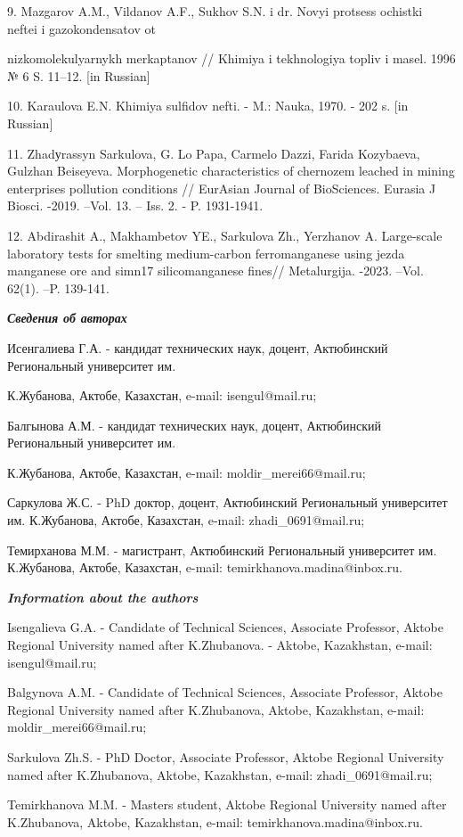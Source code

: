 \begin{noparindent}
9.
  Mazgarov A.M., Vil\textquotesingle danov A.F., Sukhov S.N. i dr. Novyi
  protsess ochistki neftei i gazokondensatov ot

  nizkomolekulyarnykh
  merkaptanov // Khimiya i tekhnologiya topliv i masel. 1996 № 6 S.
  11--12. {[}in Russian{]}

10.
  Karaulova E.N. Khimiya sul\textquotesingle fidov nefti. - M.: Nauka,
  1970. - 202 s. {[}in Russian{]}

11.
  Zhadуrassyn Sarkulova, G. Lo Papa, Carmelo Dazzi, Farida Kozybaeva,
  Gulzhan Beiseyeva. Morphogenetic characteristics of chernozem leached
  in mining enterprises pollution conditions // EurAsian Journal of
  BioSciences. Eurasia J Biosci. -2019. --Vol. 13. -- Iss. 2. - P.
  1931-1941.

12.
  Abdirashit A., Makhambetov YE., Sarkulova Zh., Yerzhanov A.
  Large-scale laboratory tests for smelting medium-carbon ferromanganese
  using jezda manganese ore and simn17 silicomanganese fines//
  Metalurgija. -2023. --Vol. 62(1). --P. 139-141.
\end{noparindent}

\emph{{\bfseries Сведения об авторах}}

\begin{noparindent}
Исенгалиева Г.А. - кандидат технических наук, доцент, Актюбинский
Региональный университет им.

К.Жубанова, Актобе, Казахстан, e-mail:
isengul@mail.ru;

Балгынова А.М. - кандидат технических наук, доцент, Актюбинский
Региональный университет им.

К.Жубанова, Актобе, Казахстан, e-mail:
moldir\_merei66@mail.ru;

Саркулова Ж.С. - PhD доктор, доцент, Актюбинский Региональный
университет им. К.Жубанова, Актобе, Казахстан, e-mail:
zhadi\_0691@mail.ru;

Темирханова М.М. - магистрант, Актюбинский Региональный университет им.
К.Жубанова, Актобе, Казахстан, e-mail: temirkhanova.madina@inbox.ru.
\end{noparindent}

\emph{{\bfseries Information about the authors}}

\begin{noparindent}
Isengalieva G.A. - Candidate of Technical Sciences, Associate Professor,
Aktobe Regional University named after K.Zhubanova. - Aktobe,
Kazakhstan, e-mail: isengul@mail.ru;

Balgynova A.M. - Candidate of Technical Sciences, Associate Professor,
Aktobe Regional University named after K.Zhubanova, Aktobe, Kazakhstan,
e-mail: moldir\_merei66@mail.ru;

Sarkulova Zh.S. - PhD Doctor, Associate Professor, Aktobe Regional
University named after K.Zhubanova, Aktobe, Kazakhstan, e-mail:
zhadi\_0691@mail.ru;

Temirkhanova M.M. - Master\textquotesingle s student, Aktobe Regional
University named after K.Zhubanova, Aktobe, Kazakhstan, e-mail:
temirkhanova.madina@inbox.ru.
\end{noparindent}
